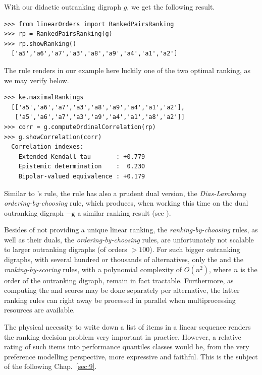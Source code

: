 With our didactic outranking digraph $g$, we get the following result.
\begin{lstlisting}[caption={Computing a \RankedPairs ranking},label=list:8.17]   
>>> from linearOrders import RankedPairsRanking
>>> rp = RankedPairsRanking(g)
>>> rp.showRanking()
  ['a5','a6','a7','a3','a8','a9','a4','a1','a2']
\end{lstlisting}

The \RankedPairs rule renders in our example here luckily one of the two optimal \Kemeny ranking, as we may verify below.
 \begin{lstlisting}
>>> ke.maximalRankings
  [['a5','a6','a7','a3','a8','a9','a4','a1','a2'],
   ['a5','a6','a7','a3','a9','a4','a1','a8','a2']]
>>> corr = g.computeOrdinalCorrelation(rp)
>>> g.showCorrelation(corr)
  Correlation indexes:
    Extended Kendall tau       : +0.779
    Epistemic determination    :  0.230
    Bipolar-valued equivalence : +0.179
\end{lstlisting}

Similar to \Kohler 's rule, the \RankedPairs rule has also a prudent dual version, the \emph{Dias-Lamboray} \emph{ordering-by-choosing} rule, which produces, when working this time on the dual outranking digraph $-\mathtt{g}$ a similar ranking result (see \citealp*{LAM-2009,DIA-2010}).

Besides of not providing a unique linear ranking, the \emph{ranking-by-choosing} rules, as well as their duals, the \emph{ordering-by-choosing} rules, are unfortunately not scalable to larger outranking digraphs (of orders $> 100$). For such bigger outranking digraphs, with several hundred or thousands of alternatives, only the \Copeland and the \NetFlows \emph{ranking-by-scoring} rules, with a polynomial complexity of $O(n^2)$, where $n$ is the order of the outranking digraph, remain in fact tractable. Furthermore, as computing the \Copeland and \NetFlows scores may be done separately per alternative, the latter ranking rules can right away be processed in parallel when multiprocessing resources are available.

\vspace{\baselineskip}
The physical necessity to write down a list of items in a linear sequence renders the ranking decision problem very important in practice. However, a relative rating of such items into performance quantiles classes would be, from the very preference modelling perspective, more expressive and faithful. This is the subject of the following Chap.~\ref{sec:9}.



%
%
